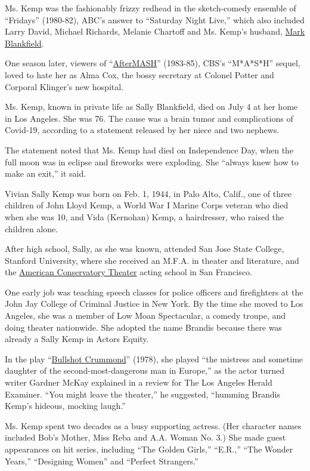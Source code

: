 Ms. Kemp was the fashionably frizzy redhead in the sketch-comedy
ensemble of ``Fridays'' (1980-82), ABC's answer to ``Saturday Night
Live,'' which also included Larry David, Michael Richards, Melanie
Chartoff and Ms. Kemp's husband,
\href{https://www.imdb.com/name/nm0087578/}{Mark Blankfield}.

One season later, viewers of
``\href{https://www.youtube.com/watch?v=EIrHkcUgAKs}{AfterMASH}''
(1983-85), CBS's ``M*A*S*H'' sequel, loved to hate her as Alma Cox, the
bossy secretary at Colonel Potter and Corporal Klinger's new hospital.

Ms. Kemp, known in private life as Sally Blankfield, died on July 4 at
her home in Los Angeles. She was 76. The cause was a brain tumor and
complications of Covid-19, according to a statement released by her
niece and two nephews.

The statement noted that Ms. Kemp had died on Independence Day, when the
full moon was in eclipse and fireworks were exploding. She ``always knew
how to make an exit,'' it said.

Vivian Sally Kemp was born on Feb. 1, 1944, in Palo Alto, Calif., one of
three children of John Lloyd Kemp, a World War I Marine Corps veteran
who died when she was 10, and Vida (Kernohan) Kemp, a hairdresser, who
raised the children alone.

After high school, Sally, as she was known, attended San Jose State
College, Stanford University, where she received an M.F.A. in theater
and literature, and the \href{https://www.act-sf.org/}{American
Conservatory Theater} acting school in San Francisco.

One early job was teaching speech classes for police officers and
firefighters at the John Jay College of Criminal Justice in New York. By
the time she moved to Los Angeles, she was a member of Low Moan
Spectacular, a comedy troupe, and doing theater nationwide. She adopted
the name Brandis because there was already a Sally Kemp in Actors
Equity.

In the play ``\href{http://lowmoan.com/bullshot/page11.html}{Bullshot
Crummond}'' (1978), she played ``the mistress and sometime daughter of
the second-most-dangerous man in Europe,'' as the actor turned writer
Gardner McKay explained in a review for The Los Angeles Herald Examiner.
``You might leave the theater,'' he suggested, ``humming Brandis Kemp's
hideous, mocking laugh.''

Ms. Kemp spent two decades as a busy supporting actress. (Her character
names included Bob's Mother, Miss Reba and A.A. Woman No. 3.) She made
guest appearances on hit series, including ``The Golden Girls,''
``E.R.,'' ``The Wonder Years,'' ``Designing Women'' and ``Perfect
Strangers.''

